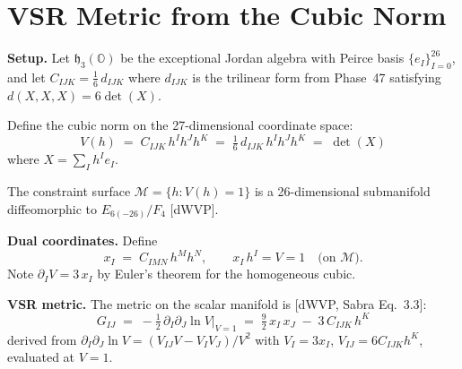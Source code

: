 %
%
%


\section{VSR Metric from the Cubic Norm}

\textbf{Setup.} Let $\mathfrak{h}_3(\mathbb{O})$ be the exceptional Jordan
algebra with Peirce basis $\{e_I\}_{I=0}^{26}$, and let
$C_{IJK} = \tfrac{1}{6}\,d_{IJK}$ where $d_{IJK}$ is the trilinear form
from Phase~47 satisfying $d(X,X,X) = 6\det(X)$.

Define the cubic norm on the 27-dimensional coordinate space:
\begin{equation}\label{eq:53.1}
  V(h) \;=\; C_{IJK}\,h^I h^J h^K \;=\; \tfrac{1}{6}\,d_{IJK}\,h^I h^J h^K
  \;=\; \det(X)
\end{equation}
where $X = \sum_I h^I e_I$.

The constraint surface $\mathcal{M} = \{h : V(h) = 1\}$ is a 26-dimensional
submanifold diffeomorphic to $E_{6(-26)}/F_4$ [dWVP].

\textbf{Dual coordinates.} Define
\begin{equation}\label{eq:53.2}
  x_I \;=\; C_{IMN}\,h^M h^N, \qquad
  x_I\,h^I = V = 1 \quad\text{(on }\mathcal{M}\text{).}
\end{equation}
Note $\partial_I V = 3\,x_I$ by Euler's theorem for the homogeneous cubic.

\textbf{VSR metric.} The metric on the scalar manifold is [dWVP, Sabra Eq.~3.3]:
\begin{equation}\label{eq:53.3}
  G_{IJ} \;=\; -\tfrac{1}{2}\,\partial_I\partial_J \ln V\Big|_{V=1}
  \;=\; \tfrac{9}{2}\,x_I\,x_J \;-\; 3\,C_{IJK}\,h^K
\end{equation}
derived from $\partial_I\partial_J\ln V = (V_{IJ}V - V_I V_J)/V^2$ with
$V_I = 3x_I$, $V_{IJ} = 6C_{IJK}h^K$, evaluated at $V=1$.

